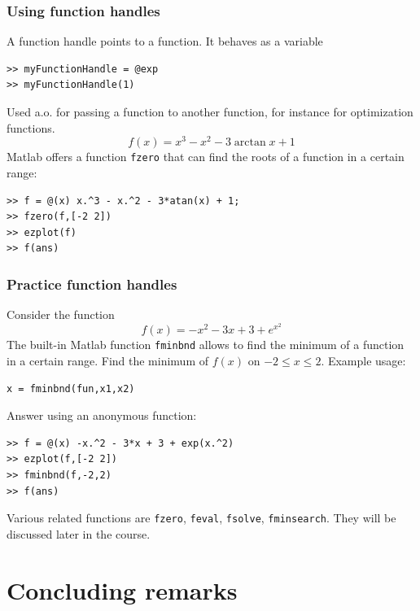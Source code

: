 \begin{frame}[fragile]
  \frametitle{Using function handles}
  A function handle points to a function. It behaves as a variable
  \begin{lstlisting}
>> myFunctionHandle = @exp 
>> myFunctionHandle(1)
  \end{lstlisting}
  \pause
  Used a.o. for passing a function to another function, for instance for optimization functions.
  \[ f(x) = x^3 -x^2 -3\arctan{x}+1 \]
  \pause
  Matlab offers a function \lstinline$fzero$ that can find the roots of a function in a certain range:
  \begin{lstlisting}
>> f = @(x) x.^3 - x.^2 - 3*atan(x) + 1;
>> fzero(f,[-2 2])
>> ezplot(f)
>> f(ans)
  \end{lstlisting}
\end{frame}

\begin{frame}[fragile]
  \frametitle{Practice function handles}
  Consider the function
  \[ f(x) = -x^2 - 3x + 3 + e^{x^2} \]
  The built-in Matlab function \lstinline$fminbnd$ allows to find the minimum of a function in a certain range. Find the minimum of $f(x)$ on $-2\leq x \leq2$.
  Example usage:
  \begin{lstlisting}
x = fminbnd(fun,x1,x2)
  \end{lstlisting}
  \pause
  Answer using an anonymous function:
  \begin{lstlisting}
>> f = @(x) -x.^2 - 3*x + 3 + exp(x.^2)
>> ezplot(f,[-2 2])
>> fminbnd(f,-2,2)
>> f(ans)
  \end{lstlisting}
  \pause
  Various related functions are \lstinline$fzero$, \lstinline$feval$, \lstinline$fsolve$, \lstinline$fminsearch$. They will be discussed later in the course.
\end{frame}

\section{Concluding remarks}
